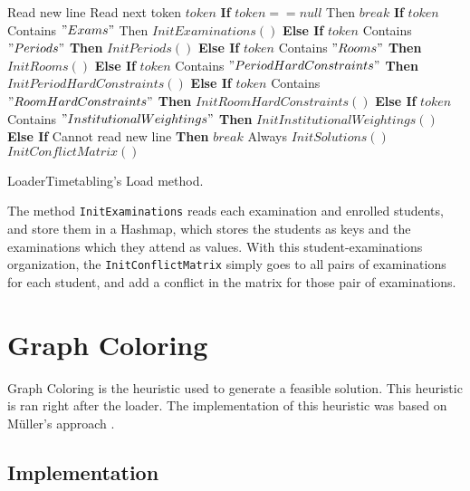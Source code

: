 \begin{algorithm}[b!]
\begin{algorithmic}
\State Read new line
\Repeat
	\State Read next token $token$
	\State \textbf{If} $token == null$ Then $break$ 
	\State \textbf{If} $token$ Contains $"Exams"$ Then $InitExaminations()$
	\State \textbf{Else If} $token$ Contains $"Periods"$ \textbf{Then} $InitPeriods()$
	\State \textbf{Else If} $token$ Contains $"Rooms"$ \textbf{Then} $InitRooms()$
	\State \textbf{Else If} $token$ Contains $"PeriodHardConstraints"$ \textbf{Then} $InitPeriodHardConstraints()$
	\State \textbf{Else If} $token$ Contains $"RoomHardConstraints"$ \textbf{Then} $InitRoomHardConstraints()$
	\State \textbf{Else If} $token$ Contains $"InstitutionalWeightings"$ \textbf{Then} $InitInstitutionalWeightings()$
	\State \textbf{Else If} Cannot read new line \textbf{Then} $break$ 
\Until Always
\State $InitSolutions()$
\State $InitConflictMatrix()$
\end{algorithmic}
\caption{LoaderTimetabling's Load method.}
\label{alg:Load}
\end{algorithm}The method \verb+InitExaminations+ reads each examination and enrolled students, and store them in a Hashmap, which stores the students as keys and the examinations which they attend as values. With this student-examinations organization, the \verb+InitConflictMatrix+ simply goes to all pairs of examinations for each student, and add a conflict in the matrix for those pair of examinations.

\section{Graph Coloring}
\label{sec:GraphColoring}

Graph Coloring is the heuristic used to generate a feasible solution. This heuristic is ran right after the loader. The implementation of this heuristic was based on M\"{u}ller's approach \cite{Mueller2009}.\\

\subsection{Implementation}


